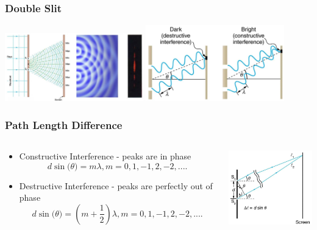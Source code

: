 \documentclass{beamer}
\begin{document}
\begin{frame}\frametitle{Double Slit}
\begin{center}
\includegraphics[width=6cm]{fig/ds1.jpg}
\includegraphics[width=6cm]{fig/ds2.jpg}
\end{center}

\end{frame}


\begin{frame}\frametitle{Path Length Difference}
\begin{columns}
\begin{column}{7cm}
\begin{itemize}
\item Constructive Interference - peaks are in phase
\[d \sin{(\theta}) = m \lambda, m = 0,1,-1,2,-2,....\]
\item Destructive Interference - peaks are perfectly out of phase
\[d \sin{(\theta}) = (m+\frac{1}{2})  \lambda, m = 0,1,-1,2,-2,....\]
\end{itemize}
\end{column}
\begin{column}{4cm}
\begin{center}
\includegraphics[width=4cm]{fig/ds3.jpg}
\end{center}
\end{column}
\end{columns}
\end{frame}
\end{document}
